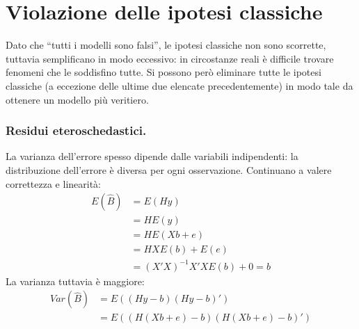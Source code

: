 \documentclass[11pt, twocolumn]{article}
\begin{document}
\newpage
\part{Violazione delle ipotesi classiche}
Dato che ``tutti i modelli sono falsi'', le ipotesi classiche non sono scorrette, tuttavia semplificano in modo eccessivo: in circostanze reali è difficile trovare fenomeni che le soddisfino tutte.
Si possono però eliminare tutte le ipotesi classiche (a eccezione delle ultime due elencate precedentemente) in modo tale da ottenere un modello più veritiero.

\section{Residui eteroschedastici.}
La varianza dell'errore spesso dipende dalle variabili indipendenti: la distribuzione dell'errore è diversa per ogni osservazione.
Continuano a valere correttezza e linearità:
\begin{align*}
  E(\hat{B}) &= E(Hy) \\
             &= H E(y) \\
             &= H E(Xb + e) \\
             &= H X E(b) + E(e) \\
             &= (X'X)^{-1}X'X E(b) + 0 = b
\end{align*}
La varianza tuttavia è maggiore:
\begin{align*}
  Var(\hat{B}) &= E((Hy - b)(Hy - b)') \\
               &= E((H(Xb + e) - b)(H(Xb + e) - b)') \\
\end{align*}
\end{document}
